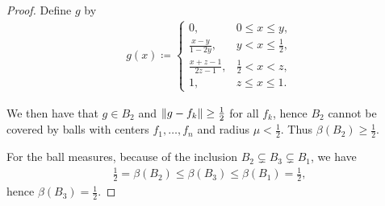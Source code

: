\begin{proof}
  Define $g$ by
  \begin{align*}
    g(x) \coloneqq \begin{cases}
      0, &0 \leq x \leq y, \\
      \frac{x - y} {1 - 2y}, &y < x \leq \frac 1 2, \\
      \frac{x + z - 1} {2z - 1}, &\frac 1 2 < x < z, \\
      1, &z \leq x \leq 1.
    \end{cases}
  \end{align*}

  \begin{figure}[h]
    \begin{center}
    \end{center}
  \end{figure}

  We then have that $g \in B_2$ and $\left\Vert g - f_k \right\Vert \geq \frac 1 2$ for all $f_k$, hence $B_2$ cannot be covered by balls with centers $f_1, \ldots, f_n$ and radius $\mu < \frac 1 2$. Thus $\beta(B_2) \geq \frac 1 2$.

  For the ball measures, because of the inclusion $B_2 \subsetneq B_3 \subsetneq B_1$, we have
  \begin{align*}
    \frac 1 2 = \beta(B_2) \leq \beta(B_3) \leq \beta(B_1) = \frac 1 2,
  \end{align*}
  hence $\beta(B_3) = \frac 1 2$.
\end{proof}

